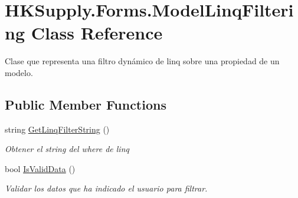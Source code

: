 \hypertarget{class_h_k_supply_1_1_forms_1_1_model_linq_filtering}{}\section{H\+K\+Supply.\+Forms.\+Model\+Linq\+Filtering Class Reference}
\label{class_h_k_supply_1_1_forms_1_1_model_linq_filtering}


Clase que representa una filtro dynámico de linq sobre una propiedad de un modelo.  


\subsection*{Public Member Functions}
\begin{DoxyCompactItemize}
\item 
string \hyperlink{class_h_k_supply_1_1_forms_1_1_model_linq_filtering_acae6326ecf09c74070e6d5155c7eb067}{Get\+Linq\+Filter\+String} ()
\begin{DoxyCompactList}\small\item\em Obtener el string del where de linq \end{DoxyCompactList}\item 
bool \hyperlink{class_h_k_supply_1_1_forms_1_1_model_linq_filtering_a66694e21272523c30da7198388f59b0f}{Is\+Valid\+Data} ()
\begin{DoxyCompactList}\small\item\em Validar los datos que ha indicado el usuario para filtrar. \end{DoxyCompactList}\end{DoxyCompactItemize}
